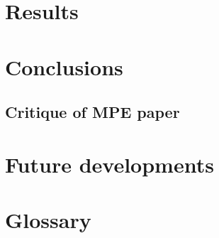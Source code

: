 \documentclass[mscthesis]{usiinfthesis}
\begin{document}









\chapter{Results}\label{chap:results}


\chapter{Conclusions}\label{chap:conclusions}

\section{Critique of MPE paper}

\chapter{Future developments}\label{chap:future-developments}



\appendix %


\backmatter

\chapter{Glossary} %

%
%



\end{document}
